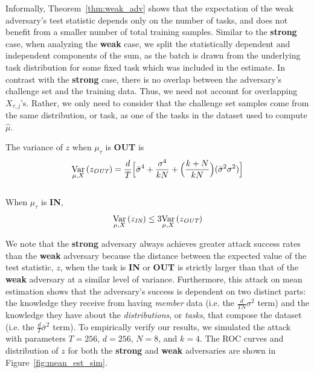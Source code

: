 Informally, Theorem~\ref{thm:weak_adv} shows that the expectation of the weak adversary's test statistic depends only on the number of tasks, and does not benefit from a smaller number of total training samples. Similar to the \textbf{strong} case, when analyzing the \textbf{weak} case, we split the statistically dependent and independent components of the sum, as the batch is drawn from the underlying task distribution for some fixed task which was included in the estimate. In contrast with the \textbf{strong} case, there is no overlap between the adversary's challenge set and the training data. Thus, we need not account for overlapping $X_{\tau,j}$'s. Rather, we only need to consider that the challenge set samples come from the same distribution, or task, as one of the tasks in the dataset used to compute $\hat{\mu}$. \\ %


\begin{thm}[Variance of $z$] \label{thm:variance}
    The variance of $z$ when $\mu_\tau$ is \textbf{OUT} is
    \[
        \var{\mu, X}{z_{\textit{OUT}}} = \frac{d}{T} \Big[ \bar{\sigma}^4 + \frac{\sigma^4}{kN} + \Big( \frac{k+N}{kN} \Big) ( \bar{\sigma}^2\sigma^2 ) \Big]
    \]
    \\
    When $\mu_\tau$ is \textbf{IN}, 
    \[
        \var{\mu,X}{{z}_{\textit{IN}}} \leq {3} \var{\mu,X}{{z}_{\textit{OUT}}}
    \]
\end{thm}

We note that the \textbf{strong} adversary always achieves greater attack success rates than the \textbf{weak} adversary because the distance between the expected value of the test statistic, $z$, when the task is \textbf{IN} or \textbf{OUT} is strictly larger than that of the \textbf{weak} adversary at a similar level of variance. 
Furthermore, this attack on mean estimation shows that the adversary's success is dependent on two distinct parts: the knowledge they receive from having \textit{member} data (i.e. the $\frac{d }{TN} \sigma^2 $ term) and the knowledge they have about the \textit{distributions}, or \textit{tasks}, that compose the dataset (i.e. the $\frac{d}{T} \bar{\sigma}^2$ term). To empirically verify our results, we simulated the attack with parameters $T = 256$, $d=256$, $N=8$, and $k=4$. The ROC curves and distribution of $z$ for both the \textbf{strong} and \textbf{weak} adversaries are shown in Figure~\ref{fig:mean_est_sim}.


